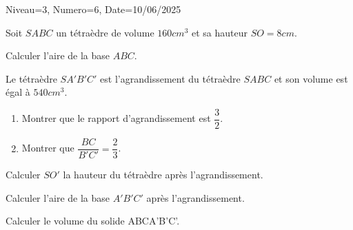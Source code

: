 \documentclass[12pt]{article}
\begin{document}
\begin{Maquette}[DS]{Niveau=3, Numero=6, Date=10/06/2025}
\begin{exercice}[BaremeDetaille=true]
Soit $SABC$  un tétraèdre de volume $160 cm^3$ et sa hauteur $SO=8cm$.
\begin{enumerate}
\begin{minipage}{.70\linewidth}
\item{} Calculer l'aire de la base $ABC$.\newline
  \anserline[3]
\item  Le tétraèdre $SA'B'C'$ est l'agrandissement du tétraèdre $SABC$ et son volume est égal à $540 cm^3$.
\end{minipage}%
\begin{minipage}{.30\linewidth}
\end{minipage}%
\begin{enumerate}
\item {} Montrer que le rapport d'agrandissement est $\dfrac{3}{2}$.\\\anserline[3]
\item{} Montrer que $\dfrac{BC}{B'C'}=\dfrac{2}{3}$.\\\anserline[3]
\end{enumerate}
\item{} Calculer $SO'$ la hauteur du tétraèdre après l'agrandissement.\\\anserline[3]
\item{} Calculer l'aire de la base $A'B'C'$ après l'agrandissement.\\\anserline[3]
\item{} Calculer le volume du solide ABCA'B'C'.\par\anserline[3]
\end{enumerate}
\end{exercice}

\end{Maquette}
\end{document}
